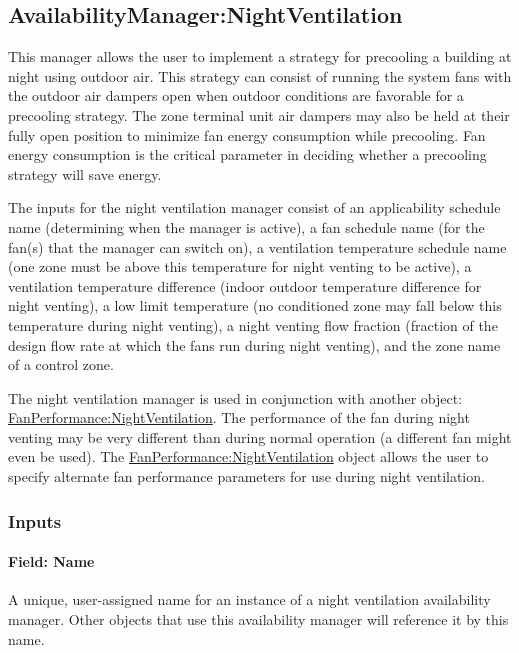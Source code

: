 \subsection{AvailabilityManager:NightVentilation}\label{availabilitymanagernightventilation}

This manager allows the user to implement a strategy for precooling a building at night using outdoor air. This strategy can consist of running the system fans with the outdoor air dampers open when outdoor conditions are favorable for a precooling strategy. The zone terminal unit air dampers may also be held at their fully open position to minimize fan energy consumption while precooling. Fan energy consumption is the critical parameter in deciding whether a precooling strategy will save energy.

The inputs for the night ventilation manager consist of an applicability schedule name (determining when the manager is active), a fan schedule name (for the fan(s) that the manager can switch on), a ventilation temperature schedule name (one zone must be above this temperature for night venting to be active), a ventilation temperature difference (indoor outdoor temperature difference for night venting), a low limit temperature (no conditioned zone may fall below this temperature during night venting), a night venting flow fraction (fraction of the design flow rate at which the fans run during night venting), and the zone name of a control zone.

The night ventilation manager is used in conjunction with another object: \hyperref[fanperformancenightventilation]{FanPerformance:NightVentilation}. The performance of the fan during night venting may be very different than during normal operation (a different fan might even be used). The \hyperref[fanperformancenightventilation]{FanPerformance:NightVentilation} object allows the user to specify alternate fan performance parameters for use during night ventilation.

\subsubsection{Inputs}\label{inputs-9-023}

\paragraph{Field: Name}\label{field-name-8-021}

A unique, user-assigned name for an instance of a night ventilation availability manager. Other objects that use this availability manager will reference it by this name.

